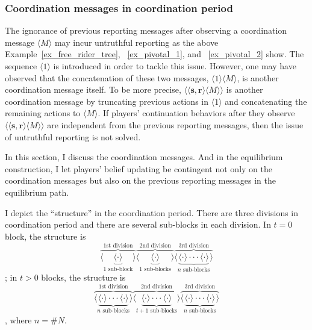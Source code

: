 \documentclass[12pt,letter]{article}
\theoremstyle{definition}
\theoremstyle{remark}
\theoremstyle{claim}
\begin{document}
\subsubsection{Coordination messages in coordination period}

The ignorance of previous reporting messages after observing a coordination message $\langle M \rangle$ may incur untruthful reporting as the above Example~\ref{ex_free_rider_tree}, ~\ref{ex_pivotal_1}, and ~\ref{ex_pivotal_2} show. The sequence $\langle 1 \rangle$ is introduced in order to tackle this issue. However, one may have observed that the concatenation of these two messages, $\langle 1 \rangle\langle M \rangle$,  is another coordination message itself. To be more precise, $\langle\langle \textbf{s}, \textbf{r} \rangle\langle M \rangle\rangle$ is another coordination message by truncating previous actions in $\langle 1 \rangle$ and concatenating the remaining actions to $\langle M \rangle$. If players' continuation behaviors after they observe $\langle\langle \textbf{s}, \textbf{r} \rangle\langle M \rangle\rangle$ are independent from the previous reporting messages, then the issue of untruthful reporting is not solved. 

In this section, I discuss the coordination messages. And in the equilibrium construction, I let players' belief updating be contingent not only on the coordination messages but also on the previous reporting messages in the equilibrium path.


I depict the ``structure'' in the coordination period. There are three divisions in coordination period and there are several sub-blocks in each division. In $t=0$ block, the structure is
\[\overbrace{\langle\underbrace{\langle \cdot \rangle }_{\text{$1$ sub-block}}\rangle}^{\text{1st division}} \overbrace{\langle\underbrace{\langle \cdot \rangle }_{\text{$1$ sub-blocks}} \rangle}^{\text{2nd division}} \overbrace{\langle\underbrace{\langle \cdot \rangle \cdot \cdot \cdot \langle \cdot \rangle}_{\text{$n$ sub-blocks}}\rangle}^{\text{3rd division}}\] 
; in $t>0$ blocks, the structure is
\[\overbrace{\langle\underbrace{\langle \cdot \rangle \cdot \cdot \cdot \langle \cdot \rangle}_{\text{$n$ sub-blocks}}\rangle}^{\text{1st division}} \overbrace{\langle\underbrace{\langle \cdot \rangle \cdot \cdot \cdot \langle \cdot \rangle}_{\text{$t+1$ sub-blocks}} \rangle}^{\text{2nd division}} \overbrace{\langle\underbrace{\langle \cdot \rangle \cdot \cdot \cdot \langle \cdot \rangle}_{\text{$n$ sub-blocks}}\rangle}^{\text{3rd division}}\] 
, where $n=\# N$. 
\end{document}
